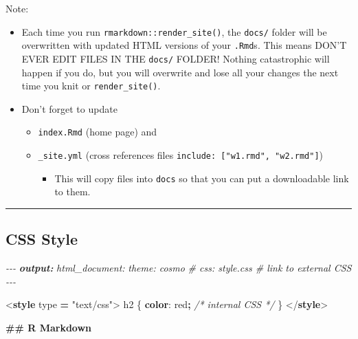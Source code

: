 \documentclass[
  a4paper,
  twoside,
  openright]{book}
\newenvironment{Shaded}{\begin{snugshade}}{\end{snugshade}}
\newcommand{\AnnotationTok}[1]{\textcolor[rgb]{0.56,0.35,0.01}{\textbf{\textit{#1}}}}
\newcommand{\CharTok}[1]{\textcolor[rgb]{0.31,0.60,0.02}{#1}}
\newcommand{\CommentTok}[1]{\textcolor[rgb]{0.56,0.35,0.01}{\textit{#1}}}
\newcommand{\ConstantTok}[1]{\textcolor[rgb]{0.56,0.35,0.01}{#1}}
\newcommand{\DataTypeTok}[1]{\textcolor[rgb]{0.13,0.29,0.53}{#1}}
\newcommand{\FunctionTok}[1]{\textcolor[rgb]{0.13,0.29,0.53}{\textbf{#1}}}
\newcommand{\KeywordTok}[1]{\textcolor[rgb]{0.13,0.29,0.53}{\textbf{#1}}}
\newcommand{\NormalTok}[1]{#1}
\newcommand{\OperatorTok}[1]{\textcolor[rgb]{0.81,0.36,0.00}{\textbf{#1}}}
\newcommand{\OtherTok}[1]{\textcolor[rgb]{0.56,0.35,0.01}{#1}}
\newcommand{\StringTok}[1]{\textcolor[rgb]{0.31,0.60,0.02}{#1}}
\providecommand{\tightlist}{%
  \setlength{\itemsep}{0pt}\setlength{\parskip}{0pt}}
\theoremstyle{definition}
\theoremstyle{definition}
\theoremstyle{definition}
\theoremstyle{definition}
\theoremstyle{remark}
\begin{document}
Note:

\begin{itemize}
\tightlist
\item
  Each time you run \texttt{rmarkdown::render\_site()}, the \texttt{docs/} folder will be overwritten with updated HTML versions of your \texttt{.Rmd}s. This means DON'T EVER EDIT FILES IN THE \texttt{docs/} FOLDER! Nothing catastrophic will happen if you do, but you will overwrite and lose all your changes the next time you knit or \texttt{render\_site()}.
\item
  Don't forget to update

  \begin{itemize}
  \tightlist
  \item
    \texttt{index.Rmd} (home page) and
  \item
    \texttt{\_site.yml} (cross references files \texttt{include:\ {[}"w1.rmd",\ "w2.rmd"{]}})

    \begin{itemize}
    \tightlist
    \item
      This will copy files into \texttt{docs} so that you can put a downloadable link to them.
    \end{itemize}
  \end{itemize}
\end{itemize}

\begin{center}\rule{0.5\linewidth}{0.5pt}\end{center}

\subsection*{CSS Style}\label{css-style}

\begin{Shaded}
\begin{Highlighting}[]
\CommentTok{{-}{-}{-}}
\AnnotationTok{output:}\CommentTok{ }
\CommentTok{  html\_document:}
\CommentTok{    theme: cosmo}
\CommentTok{   \# css: style.css \# link to external CSS}
\CommentTok{{-}{-}{-}}

\DataTypeTok{\textless{}}\KeywordTok{style}\OtherTok{ type }\OperatorTok{=} \StringTok{"text/css"}\DataTypeTok{\textgreater{}} 
\NormalTok{h2 \{}
  \KeywordTok{color}\CharTok{:} \ConstantTok{red}\OperatorTok{;} \CommentTok{/* internal CSS */}
\NormalTok{\}}
\DataTypeTok{\textless{}/}\KeywordTok{style}\DataTypeTok{\textgreater{}}

\FunctionTok{\#\# R Markdown}
\end{Highlighting}
\end{Shaded}
\end{document}

